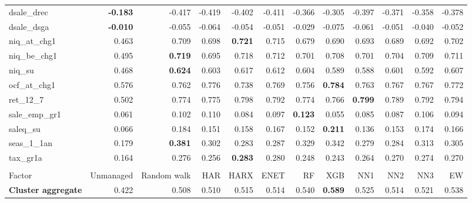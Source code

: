 \begin{landscape}
\begin{longtable}{>{\raggedright\arraybackslash}p{2.6cm}rrrrrrrrrrr}
dsale\_drec & \textbf{-0.183} & -0.417 & -0.419 & -0.402 & -0.411 & -0.366 & -0.305 & -0.397 & -0.371 & -0.358 & -0.378 \\
dsale\_dsga & \textbf{-0.010} & -0.055 & -0.064 & -0.054 & -0.051 & -0.029 & -0.075 & -0.061 & -0.051 & -0.040 & -0.052 \\
niq\_at\_chg1 & 0.463 & 0.709 & 0.698 & \textbf{\cellcolor{blue!10}0.721} & \cellcolor{blue!10}0.715 & 0.679 & 0.690 & 0.693 & 0.689 & 0.692 & 0.702 \\
niq\_be\_chg1 & 0.495 & \textbf{0.719} & 0.695 & 0.718 & 0.712 & 0.701 & 0.708 & 0.701 & 0.704 & 0.709 & 0.711 \\
niq\_su & 0.468 & \textbf{0.624} & 0.603 & 0.617 & 0.612 & 0.604 & 0.589 & 0.588 & 0.601 & 0.592 & 0.607 \\
ocf\_at\_chg1 & 0.576 & 0.762 & \cellcolor{blue!10}0.776 & 0.738 & \cellcolor{blue!10}0.769 & 0.756 & \textbf{\cellcolor{blue!10}0.784} & \cellcolor{blue!10}0.763 & \cellcolor{blue!10}0.767 & \cellcolor{blue!10}0.767 & \cellcolor{blue!10}0.772 \\
ret\_12\_7 & 0.502 & 0.774 & \cellcolor{blue!10}0.775 & \cellcolor{blue!10}0.798 & \cellcolor{blue!10}0.792 & 0.774 & 0.766 & \textbf{\cellcolor{blue!10}0.799} & \cellcolor{blue!10}0.789 & \cellcolor{blue!10}0.792 & \cellcolor{blue!10}0.794 \\
sale\_emp\_gr1 & 0.061 & 0.102 & \cellcolor{blue!10}0.110 & 0.084 & 0.097 & \textbf{\cellcolor{blue!10}0.123} & 0.055 & 0.085 & 0.087 & \cellcolor{blue!10}0.106 & 0.094 \\
saleq\_su & 0.066 & 0.184 & 0.151 & 0.158 & 0.167 & 0.152 & \textbf{\cellcolor{blue!10}0.211} & 0.136 & 0.153 & 0.174 & 0.166 \\
seas\_1\_1an & 0.179 & \textbf{0.381} & 0.302 & 0.283 & 0.287 & 0.329 & 0.342 & 0.279 & 0.284 & 0.313 & 0.305 \\
tax\_gr1a & 0.164 & 0.276 & 0.256 & \textbf{\cellcolor{blue!10}0.283} & \cellcolor{blue!10}0.280 & 0.248 & 0.243 & 0.264 & 0.270 & 0.274 & 0.270 \\
\hline
\multicolumn{12}{@{}l}{\textit{Panel H. Profitability}} \\
\hline
Factor & Unmanaged & Random walk & HAR & HARX & ENET & RF & XGB & NN1 & NN2 & NN3 & EW \\
\hline
\textbf{Cluster aggregate} & 0.422 & 0.508 & \cellcolor{blue!10}0.510 & \cellcolor{blue!10}0.515 & \cellcolor{blue!10}0.514 & \cellcolor{blue!10}0.540 & \textbf{\cellcolor{blue!10}0.589} & \cellcolor{blue!10}0.525 & \cellcolor{blue!10}0.514 & \cellcolor{blue!10}0.521 & \cellcolor{blue!10}0.538 \\

\end{longtable}
\end{landscape}
